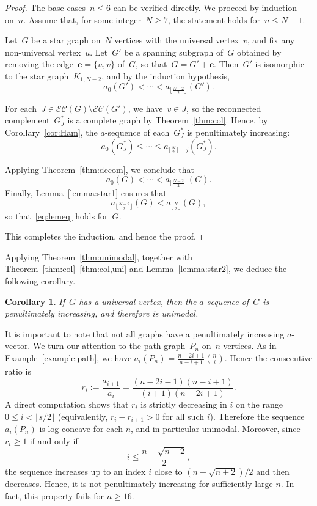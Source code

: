\documentclass[10pt]{amsart}
\theoremstyle{plain}
\newtheorem{corollary}[theorem]{Corollary}
\numberwithin{equation}{section}
\theoremstyle{definition}
\newcommand{\edge}{\mathbf{e}}
\newcommand{\EC}{\mathcal{E}\mathcal{C}}
\begin{document}
\begin{proof}
    The base cases~$n \leq 6$ can be verified directly.
    We proceed by induction on~$n$.
    Assume that, for some integer~$N \geq 7$, the statement holds for~$n \leq N-1$.
    
    Let~$G$ be a star graph on~$N$ vertices with the universal vertex~$v$, and fix any non-universal vertex~$u$.
    Let~$G'$ be a spanning subgraph of~$G$ obtained by removing the edge~$\edge = \{u,v\}$ of~$G$, so that~$G = G' +\edge$.
    Then~$G'$ is isomorphic to the star graph~$K_{1,N-2}$, and by the induction hypothesis,
    $$
    a_0(G') < \cdots < a_{\lfloor \frac{N-2}{2} \rfloor}(G').
    $$
    
    For each~$J \in \EC(G)\setminus \EC(G')$, we have~$v \in J$, so the reconnected complement~$G^\ast_J$ is a complete graph by Theorem~\ref{thm:col}.
    Hence, by Corollary~\ref{cor:Ham}, the $a$-sequence of each~$G^\ast_J$ is penultimately increasing:
    $$
    a_0(G^\ast_J) \leq \cdots \leq a_{\lfloor \frac{N}{2} \rfloor - j}(G^\ast_J).
    $$
    
    Applying Theorem~\ref{thm:decom}, we conclude that
    $$
    a_0(G) < \cdots < a_{\lfloor \frac{N-2}{2} \rfloor}(G).
    $$
    Finally, Lemma~\ref{lemma:star1} ensures that
    $$
    a_{\lfloor \frac{N-2}{2} \rfloor}(G) < a_{\lfloor \frac{N}{2} \rfloor}(G),
    $$
    so that~\eqref{eq:lemeq} holds for~$G$.
    
    This completes the induction, and hence the proof.
\end{proof}

Applying Theorem~\ref{thm:unimodal}, together with Theorem~\ref{thm:col}~\eqref{thm:col,uni} and Lemma~\ref{lemma:star2}, we deduce the following corollary.
\begin{corollary} \label{cor:universal_vertex}
  If~$G$ has a universal vertex, then the $a$-sequence of~$G$ is penultimately increasing, and therefore is unimodal.
\end{corollary}

It is important to note that not all graphs have a penultimately increasing $a$-vector.
We turn our attention to the path graph~$P_n$ on~$n$ vertices.
As in Example~\ref{example:path}, we have $a_i (P_n) = \frac{n-2i+1}{n-i+1} \binom{n}{i}$.
Hence the consecutive ratio is
$$
    r_i:=\frac{a_{i+1}}{a_i} =\frac{(n-2i-1)(n-i+1)}{(i+1)(n-2i+1)}.
$$
A direct computation shows that $r_i$ is strictly decreasing in $i$ on the range $0\le i<\lfloor s/2\rfloor$ (equivalently, $r_i-r_{i+1}>0$ for all such $i$).
Therefore the sequence $a_i (P_n)$ is log-concave for each $n$, and in particular unimodal.
Moreover, since $r_i\ge 1$ if and only if
$$
    i\le \frac{n-\sqrt{n+2}}{2},
$$
the sequence increases up to an index $i$ close to $(n-\sqrt{n+2})/2$ and then decreases.
Hence, it is not penultimately increasing for sufficiently large $n$.
In fact, this property fails for $n\ge 16$.  
\end{document}
